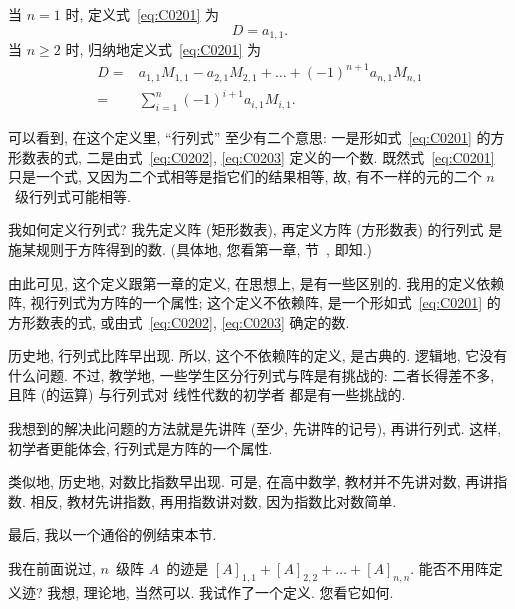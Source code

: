 \documentclass[../libro]{subfiles}
\begin{document}
\begin{definition}
    当 \(n = 1\) 时, 定义式~\eqref{eq:C0201} 为
    \begin{equation}
        D = a_{1,1}.
        \label{eq:C0202}
    \end{equation}
    当 \(n \geq 2\) 时, 归纳地定义式~\eqref{eq:C0201} 为
    \begin{equation}
        \begin{aligned}
            D
            = {} &
            a_{1,1} M_{1,1} - a_{2,1} M_{2,1} + \dots +
            (-1)^{n+1} a_{n,1} M_{n,1}
            \\
            = {} &
            \sum_{i = 1}^{n} {(-1)^{i+1} a_{i,1} M_{i,1}}.
        \end{aligned}
        \label{eq:C0203}
    \end{equation}
\end{definition}

可以看到, 在这个定义里,
``行列式'' 至少有二个意思:
一是形如式~\eqref{eq:C0201} 的方形数表的式,
二是由式~\eqref{eq:C0202}, \eqref{eq:C0203}
定义的一个数.
既然式~\eqref{eq:C0201} 只是一个式,
又因为二个式相等是指它们的结果相等,
故, 有不一样的元的二个 \(n\)~级行列式可能相等.

我如何定义行列式?
我先定义阵 (矩形数表),
再定义方阵 (方形数表) 的行列式%
是施某规则于方阵得到的数.
(具体地, 您看第一章, 节~,  即知.)

由此可见, 这个定义跟第一章的定义,
在思想上, 是有一些区别的.
我用的定义依赖阵,
视行列式为方阵的一个属性;
这个定义不依赖阵,
是一个形如式~\eqref{eq:C0201} 的方形数表的式,
或由式~\eqref{eq:C0202}, \eqref{eq:C0203} 确定的数.

历史地, 行列式比阵早出现.
所以, 这个不依赖阵的定义, 是古典的.
逻辑地, 它没有什么问题.
不过, 教学地, 一些学生区分行列式与阵是有挑战的:
二者长得差不多,
且阵 (的运算) 与行列式对%
线性代数的初学者%
都是有一些挑战的.

我想到的解决此问题的方法就是先讲阵
(至少, 先讲阵的记号),
再讲行列式.
这样, 初学者更能体会,
行列式是方阵的一个属性.

类似地, 历史地, 对数比指数早出现.
可是, 在高中数学,
教材并不先讲对数, 再讲指数.
相反, 教材先讲指数, 再用指数讲对数,
因为指数比对数简单.

\vspace{2ex}

最后, 我以一个通俗的例结束本节.

我在前面说过,
\(n\)~级阵 \(A\)~的迹是
\([A]_{1,1} + [A]_{2,2} + \dots + [A]_{n,n}\).
能否不用阵定义迹?
我想, 理论地, 当然可以.
我试作了一个定义.
您看它如何.
\end{document}
